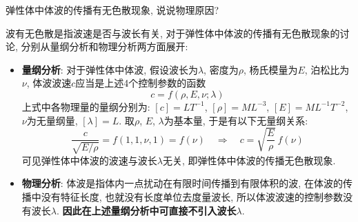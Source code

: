 \begin{problem}[23]
弹性体中体波的传播有无色散现象, 说说物理原因?
\end{problem}
\begin{solution}
波有无色散是指波速是否与波长有关, 对于弹性体中体波的传播有无色散现象的讨论, 分别从量纲分析和物理分析两方面展开:
\begin{itemize}
\item \textbf{量纲分析}: 对于弹性体中体波, 假设波长为$\lambda$, 密度为$\rho$, 杨氏模量为$E$, 泊松比为$\nu$, 体波波速$c$应当是上述4个控制参数的函数
\[
c = f(\rho, E, \nu; \lambda)
\]
上式中各物理量的量纲分别为: $[c]=LT^{-1}$, $[\rho]=ML^{-3}$, $[E]=ML^{-1}T^{-2}$, $\nu$为无量纲量, $[\lambda]=L$. 取$\rho$, $E$, $\lambda$为基本量, 于是有以下无量纲关系:
\[
\frac{c}{\sqrt{E/\rho}} = f(1,1,\nu,1) = f(\nu) 
\quad\Longrightarrow\quad
c = \sqrt{\frac{E}{\rho}}~f(\nu)
\]
可见弹性体中体波的波速与波长$\lambda$无关, 即弹性体中体波的传播无色散现象.

\item \textbf{物理分析}: 体波是指体内一点扰动在有限时间传播到有限体积的波, 在体波的传播中没有特征长度, 也就没有长度单位去度量波长, 所以体波波速的控制参数没有波长$\lambda$. \textbf{因此在上述量纲分析中可直接不引入波长$\lambda$}.
\end{itemize}
\end{solution}
